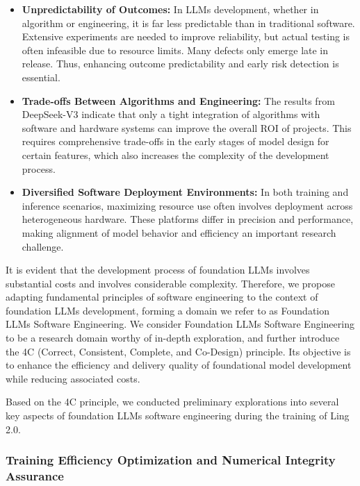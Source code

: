 \documentclass[table]{gtech}
\theoremstyle{definition}
\begin{document}
\begin{itemize}[leftmargin=1.5em]
    \item \textbf{Unpredictability of Outcomes:} In LLMs development, whether in algorithm or engineering, it is far less predictable than in traditional software. Extensive experiments are needed to improve reliability, but actual testing is often infeasible due to resource limits. Many defects only emerge late in release. Thus, enhancing outcome predictability and early risk detection is essential.
    
    \item \textbf{Trade-offs Between Algorithms and Engineering:} The results from DeepSeek-V3 indicate that only a tight integration of algorithms with software and hardware systems can improve the overall ROI of projects. This requires comprehensive trade-offs in the early stages of model design for certain features, which also increases the complexity of the development process.

    \item \textbf{Diversified Software Deployment Environments:} In both training and inference scenarios, maximizing resource use often involves deployment across heterogeneous hardware. These platforms differ in precision and performance, making alignment of model behavior and efficiency an important research challenge.
\end{itemize}

It is evident that the development process of foundation LLMs involves substantial costs and involves considerable complexity. Therefore, we propose adapting fundamental principles of software engineering to the context of foundation LLMs development, forming a domain we refer to as Foundation LLMs Software Engineering.
We consider Foundation LLMs Software Engineering to be a research domain worthy of in-depth exploration, and further introduce the 4C (Correct, Consistent, Complete, and Co-Design) principle. Its objective is to enhance the efficiency and delivery quality of foundational model development while reducing associated costs.

Based on the 4C principle, we conducted preliminary explorations into several key aspects of foundation LLMs software engineering during the training of Ling 2.0.

\subsubsection{Training Efficiency Optimization and Numerical Integrity Assurance}
\end{document}
